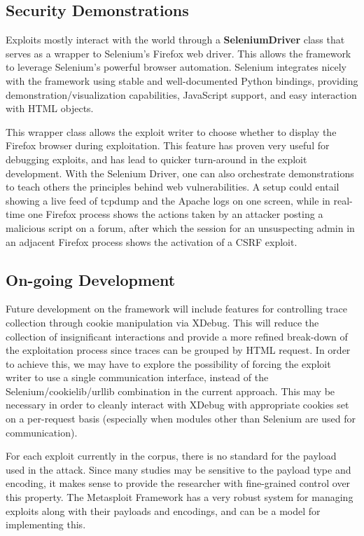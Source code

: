 \documentclass[letterpaper,twocolumn,10pt]{article}
\begin{document}
\subsection{Security Demonstrations}

Exploits mostly interact with the world through a {\bf SeleniumDriver} class that serves as a wrapper to Selenium's Firefox web driver. This allows the framework to leverage Selenium's powerful browser automation. Selenium integrates nicely with the framework using stable and well-documented Python bindings, providing demonstration/visualization capabilities, JavaScript support, and easy interaction with HTML objects.\par
This wrapper class allows the exploit writer to choose whether to display the Firefox browser during exploitation. This feature has proven very useful for debugging exploits, and has lead to quicker turn-around in the exploit development. With the Selenium Driver, one can also orchestrate demonstrations to teach others the principles behind web vulnerabilities.  A setup could entail showing a live feed of tcpdump and the Apache logs on one screen, while in real-time one Firefox process shows the actions taken by an attacker posting a malicious script on a forum, after which the session for an unsuspecting admin in an adjacent Firefox process shows the activation of a CSRF exploit. 

\subsection{On-going Development}
  Future development on the framework will include features for controlling trace collection through cookie manipulation via XDebug. This will reduce the collection of insignificant interactions and provide a more refined break-down of the exploitation process since traces can be grouped by HTML request. In order to achieve this, we may have to explore the possibility of forcing the exploit writer to use a single communication interface, instead of the Selenium/cookielib/urllib combination in the current approach. This may be necessary in order to cleanly interact with XDebug with appropriate cookies set on a per-request basis (especially when modules other than Selenium are used for communication).\par
For each exploit currently in the corpus, there is no standard for the payload used in the attack. Since many studies may be sensitive to the payload type and encoding, it makes sense to provide the researcher with fine-grained control over this property. The Metasploit Framework has a very robust system for managing exploits along with their payloads and encodings, and can be a model for implementing this.
\end{document}
